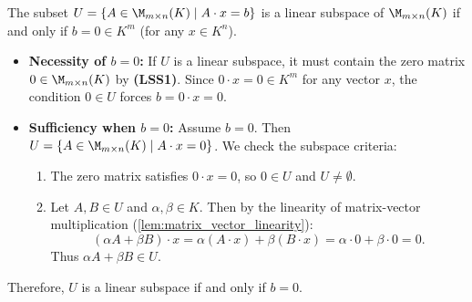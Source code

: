 \begin{exercisesolution*}
\label{sol:matrix_subspace_vector_constraint}
The subset $U = \{A \in \M_{m \times n}(K) \mid A \cdot x = b\}$ is a linear subspace of $\M_{m \times n}(K)$ if and only if $b = 0 \in K^m$ (for any $x \in K^n$).

\begin{itemize}
    \item \textbf{Necessity of $b = 0$:}
    If $U$ is a linear subspace, it must contain the zero matrix $0 \in \M_{m \times n}(K)$ by \textbf{(LSS1)}. Since $0 \cdot x = 0 \in K^m$ for any vector $x$, the condition $0 \in U$ forces $b = 0 \cdot x = 0$.

    \item \textbf{Sufficiency when $b = 0$:}
    Assume $b = 0$. Then $U = \{A \in \M_{m \times n}(K) \mid A \cdot x = 0\}$. We check the subspace criteria:
    \begin{enumerate}[label=\textbf{(\alph*)}]
        \item The zero matrix satisfies $0 \cdot x = 0$, so $0 \in U$ and $U \ne \emptyset$.
        \item Let $A, B \in U$ and $\alpha, \beta \in K$. Then by the linearity of matrix-vector multiplication (\cref{lem:matrix_vector_linearity}):
        \[
        (\alpha A + \beta B) \cdot x = \alpha (A \cdot x) + \beta (B \cdot x) = \alpha \cdot 0 + \beta \cdot 0 = 0.
        \]
        Thus $\alpha A + \beta B \in U$.
    \end{enumerate}
\end{itemize}
Therefore, $U$ is a linear subspace if and only if $b = 0$.
\end{exercisesolution*}

